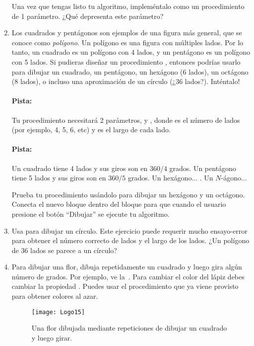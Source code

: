 \begin{enumerate}
Una vez que tengas listo tu algoritmo, impleméntalo como un
procedimiento de 1 parámetro. ¿Qué depresenta este parámetro?

\item Los cuadrados y pentágonos son ejemplos de una figura más
  general, que se conoce como \emph{polígono}. Un polígono es una
  figura con múltiples lados. Por lo tanto, un cuadrado es un polígono
  con 4 lados, y un pentágono es un polígono con 5 lados. Si pudieras
  diseñar un procedimiento , entonces podrías
  usarlo para dibujar un cuadrado, un pentágono, un hexágono (6
  lados), un octágono (8 lados), o incluso una aproximación de un
  círculo (¿36 lados?). Inténtalo!

  \paragraph{Pista:} Tu procedimiento necesitará 2
  parámetros,  y , donde  es el
  número de lados (por ejemplo, 4, 5, 6, etc) y  es el
  largo de cada lado.

\paragraph{Pista:} Un cuadrado tiene 4 lados y sus giros son en
$360/4$ grados. Un pentágono tiene 5 lados y sus giros son en $360/5$
grados. Un hexágono... . Un $N$-ágono...

Prueba tu procedimiento  usándolo para dibujar un
hexágono y un octágono. Conecta el nuevo bloque dentro del bloque
 para que cuando el usuario presione el botón
``Dibujar'' se ejecute tu algoritmo.

\item Usa  para dibujar un círculo. Este
  ejercicio puede requerir mucho ensayo-error para obtener el número
  correcto de lados y el largo de los lados. ¿Un polígono de 36 lados
  se parece a un círculo?

\item Para dibujar una flor, dibuja repetidamente un cuadrado y luego
  gira algún número de grados. Por ejemplo, ve
  la~. Para cambiar el color del lápiz debes cambiar
  la propiedad . Puedes usar el
  procedimiento  que ya viene provisto
  para obtener colores al azar.

\begin{figure}[H]
  \centering
  \texttt{[image: Logo15]}
  \caption{Una flor dibujada mediante repeticiones de dibujar un
    cuadrado y luego girar.}
  \label{fig:Logo15}
\end{figure}


\end{enumerate}
